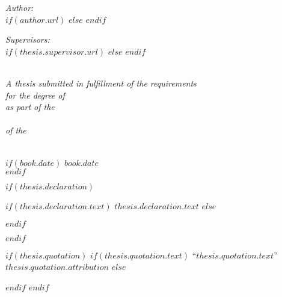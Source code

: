 \begin{titlepage}
\begin{center}
\begin{minipage}[t]{0.4\textwidth}
  \begin{flushleft} \large
    \emph{Author:}\\
    $if(author.url)$
      \href{$author.url$}{\authorname} %
    $else$
      \authorname
    $endif$
  \end{flushleft}
\end{minipage}
\begin{minipage}[t]{0.4\textwidth}
  \begin{flushright} \large
    \emph{Supervisors:} \\
    $if(thesis.supervisor.url)$%
      \href{$thesis.supervisor.url$}{\supname} %
    $else$%
      \supname
    $endif$
  \end{flushright}
\end{minipage}\\[2cm]

\large \textit{A thesis submitted in fulfillment of the requirements\\
for the degree of \degreename}\\[0.3cm]
\textit{as part of the}\\[0.4cm]
\groupname\\
\textit{of the}\\[0.4cm]
\deptname\\[2cm]

\vfill

$if(book.date)$
{\large $book.date$}\\[4cm]
$endif$

\vfill
\end{center}
\end{titlepage}

$if(thesis.declaration)$
  \begin{declaration}
    \addchaptertocentry{\authorshipname} %
    $if(thesis.declaration.text)$
      $thesis.declaration.text$
    $else$
      
    $endif$
  \end{declaration}
  \cleardoublepage
$endif$

$if(thesis.quotation)$
  \vspace*{0.2\textheight}
  $if(thesis.quotation.text)$
    \noindent``{\itshape $thesis.quotation.text$}''\bigbreak
    \hfill $thesis.quotation.attribution$
  $else$
    
  $endif$
$endif$

